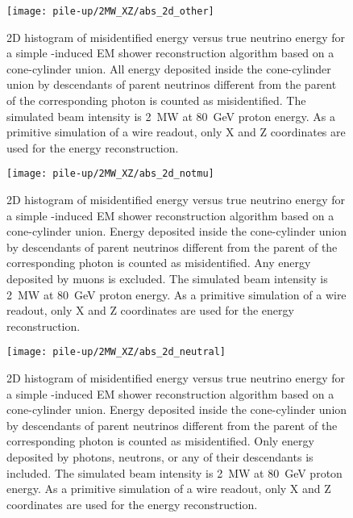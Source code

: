 \begin{figure}[htb]
	\centering
	\texttt{[image: pile-up/2MW\_XZ/abs\_2d\_other]}
	\caption{2D histogram of misidentified energy versus true neutrino energy for a simple \Pgpz-induced EM shower reconstruction algorithm based on a cone-cylinder union.
		All energy deposited inside the cone-cylinder union by descendants of parent neutrinos different from the parent of the corresponding \Pgpz photon is counted as misidentified.
		The simulated beam intensity is \SI{2}{\mega\watt} at \SI{80}{\giga\electronvolt} proton energy.
		As a primitive simulation of a wire readout, only X and Z coordinates are used for the energy reconstruction.}
\end{figure}

\begin{figure}[htb]
	\centering
	\texttt{[image: pile-up/2MW\_XZ/abs\_2d\_notmu]}
	\caption{2D histogram of misidentified energy versus true neutrino energy for a simple \Pgpz-induced EM shower reconstruction algorithm based on a cone-cylinder union.
		Energy deposited inside the cone-cylinder union by descendants of parent neutrinos different from the parent of the corresponding \Pgpz photon is counted as misidentified.
		Any energy deposited by muons is excluded.
		The simulated beam intensity is \SI{2}{\mega\watt} at \SI{80}{\giga\electronvolt} proton energy.
		As a primitive simulation of a wire readout, only X and Z coordinates are used for the energy reconstruction.}
\end{figure}

\begin{figure}[htb]
	\centering
	\texttt{[image: pile-up/2MW\_XZ/abs\_2d\_neutral]}
	\caption{2D histogram of misidentified energy versus true neutrino energy for a simple \Pgpz-induced EM shower reconstruction algorithm based on a cone-cylinder union.
		Energy deposited inside the cone-cylinder union by descendants of parent neutrinos different from the parent of the corresponding \Pgpz photon is counted as misidentified.
		Only energy deposited by photons, neutrons, or any of their descendants is included.
		The simulated beam intensity is \SI{2}{\mega\watt} at \SI{80}{\giga\electronvolt} proton energy.
		As a primitive simulation of a wire readout, only X and Z coordinates are used for the energy reconstruction.}
\end{figure}

